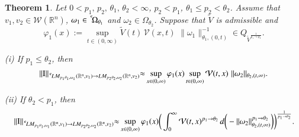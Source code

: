 \documentclass[11pt]{amsart}
\theoremstyle{plain}
\newtheorem{thm}{Theorem}[section]
\theoremstyle{definition}
\numberwithin{thm}{section}
\numberwithin{equation}{section}
\begin{document}
\begin{thm}\label{maintheorem1}
	Let $0<p_1, \,p_2, \,{\theta}_1, \,{\theta}_2 < \infty$, $p_2 < p_1$, ${\theta}_1 \leq p_2 < {\theta}_2$. Assume that $v_1, v_2\in {{\mathcal W}}({{\mathbb R}^n})$, ${\omega}_1 \in {\,^{^{\bf c}}\!}{{\Omega}_{{\theta}_1}}$ and ${\omega}_2\in {\Omega}_{{\theta}_2}$. 
	Suppose that $\widetilde{V}$ is admissible and
	\begin{equation*}
	{\varphi}_1(x):= \sup_{t\in (0,\infty)} \widetilde{V}(t) \, {\mathcal V}(x,t) \,\, \|{\omega}_1\|_{{\theta}_1,(0,t)}^{-1} \in Q_{ \widetilde{V}^{\frac{1}{p_1 {\rightarrow} p_2}}}.
	\end{equation*}
	
	{\rm (i)} If $p_1 \le {\theta}_2$, then
	\begin{equation*}
	\|{\operatorname{I}}\|_{{\,^{^{\bf c}}\!} LM_{p_1{\theta}_1,{\omega}_1}({{\mathbb R}^n},v_1){\rightarrow} LM_{p_2{\theta}_2,{\omega}_2}({{\mathbb R}^n},v_2)}{\approx} \sup_{x\in(0,\infty)} {\varphi}_1(x) \sup_{t\in (0,\infty)} {\mathcal V} (t,x) \,\, \|{\omega}_2\|_{{\theta}_2,(t,\infty)}.
	\end{equation*}
	
	{\rm (ii)} If ${\theta}_2 < p_1$, then
	\begin{align*}
	\|{\operatorname{I}}\|_{{\,^{^{\bf c}}\!} LM_{p_1{\theta}_1,{\omega}_1}({{\mathbb R}^n},v_1){\rightarrow} LM_{p_2{\theta}_2,{\omega}_2}({{\mathbb R}^n},v_2)} {\approx} \sup_{x\in(0,\infty)} {\varphi}_1(x) \bigg(\int_0^\infty  {\mathcal V}(t,x)^{p_1{\rightarrow} {\theta}_2}\,d\bigg(-\|{\omega}_2\|_{{\theta}_2,(t,\infty)}^{p_1{\rightarrow} {\theta}_2}\bigg) \bigg)^{\frac{1}{p_1{\rightarrow}{\theta}_2}}.
	\end{align*}
\end{thm}
\end{document}
